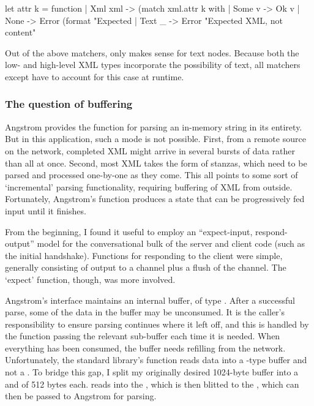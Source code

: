 \documentclass[12pt,a4paper,twoside,openright]{report}
\begin{document}
{\begin{ocaml}
let attr k = function
  | Xml xml -> (match xml.attr k with
    | Some v -> Ok v
    | None -> Error (format "Expected %
  | Text _ -> Error "Expected XML, not content"
\end{ocaml}

Out of the above matchers, only  makes sense for text nodes. Because both the low- and high-level XML types incorporate the possibility of text, all matchers except  have to account for this case at runtime.

\subsubsection{The question of buffering}
Angstrom provides the  function for parsing an in-memory string in its entirety. But in this application, such a mode is not possible. First, from a remote source on the network, completed XML might arrive in several bursts of data rather than all at once. Second, most XML takes the form of stanzas, which need to be parsed and processed one-by-one as they come. This all points to some sort of `incremental' parsing functionality, requiring buffering of XML from outside. Fortunately, Angstrom's  function produces a state that can be progressively fed input until it finishes.

From the beginning, I found it useful to employ an ``expect-input, respond-output'' model for the conversational bulk of the server and client code (such as the initial handshake). Functions for responding to the client were simple, generally consisting of output to a channel plus a flush of the channel. The `expect' function, though, was more involved.

Angstrom's  interface maintains an internal buffer, of type . After a successful parse, some of the data in the buffer may be unconsumed. It is the caller's responsibility to ensure parsing continues where it left off, and this is handled by the function passing the relevant sub-buffer each time it is needed. When everything has been consumed, the buffer needs refilling from the network. Unfortunately, the standard library's  function reads data into a -type buffer and not a . To bridge this gap, I split my originally desired 1024-byte buffer into a  and  of 512 bytes each.  reads into the , which is then blitted to the , which can then be passed to Angstrom for parsing.

}
\end{document}
